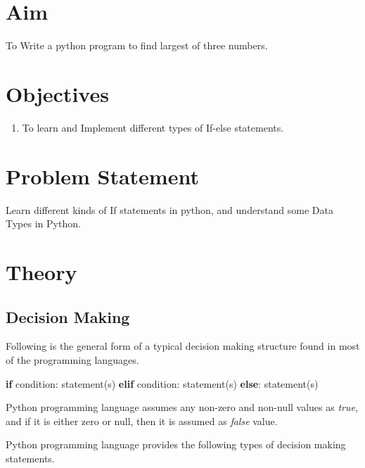\documentclass[11pt]{article}
\newenvironment{Shaded}{}{}
\newcommand{\NormalTok}[1]{{#1}}
\newcommand{\ControlFlowTok}[1]{\textcolor[rgb]{0.00,0.44,0.13}{\textbf{{#1}}}}
\begin{document}
\tableofcontents
\thispagestyle{empty}
\clearpage

\setcounter{page}{1}

\section{Aim}
To Write a python program to find largest of three numbers.

\section{Objectives}
\begin{enumerate}
	\item To learn and Implement different types of If-else statements. 
\end{enumerate}

\section{Problem Statement}
Learn different kinds of If statements in python, and understand some Data Types in Python. 
    

\hypertarget{theory}{%
\section{Theory}\label{theory}}

    \hypertarget{decision-making}{%
\subsection{Decision Making}\label{decision-making}}

Following is the general form of a typical decision making structure
found in most of the programming languages.

\begin{Shaded}
\begin{Highlighting}[]
\ControlFlowTok{if}\NormalTok{ condition:}
\NormalTok{    statement(s)}
\ControlFlowTok{elif}\NormalTok{ condition:}
\NormalTok{    statement(s)}
\ControlFlowTok{else}\NormalTok{:}
\NormalTok{    statement(s)}
\end{Highlighting}
\end{Shaded}

Python programming language assumes any non-zero and non-null values as
\emph{true}, and if it is either zero or null, then it is assumed as
\emph{false} value.

Python programming language provides the following types of decision
making statements.
\end{document}
